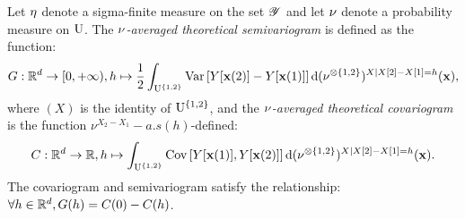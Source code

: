 Let $\eta$ denote a sigma-finite measure on the set $\mathscr{Y}$  and let $\nu$ denote a probability measure on  $\mathrm{U}$.
The {\em $\nu$-averaged theoretical semivariogram} is defined as the function: 
\begin{equation}G:\mathbb{R}^d\to[0,+\infty),h\mapsto\frac12\int_{\mathrm{U}^{\{1,2\}}} \mathrm{Var}\left[Y[\mathbf{x}(2)]-Y[\mathbf{x}(1)]\right] \mathrm{d}(\nu^{\otimes \{1,2\}})^{X\mid X[2]-X[1]=h}(\mathbf{x}),\label{eq:averagesemivariogram}\end{equation} 
where $(X)$ is the identity of $\mathrm{U}^{\{1,2\}}$, and the {\em $\nu$-averaged theoretical covariogram} is the function  $\nu^{X_2-X_1}-a.s(h)$-defined:
\begin{equation}C:\mathbb{R}^d\to\mathbb{R}, h\mapsto\int_{\mathrm{U}^{\{1,2\}}} \mathrm{Cov}\left[Y[\mathbf{x}(1)],Y[\mathbf{x}(2)]\right] \mathrm{d}(\nu^{\otimes \{1,2\}})^{X\mid X[2]-X[1]=h}(\mathbf{x}).\label{eq:averagecovariogram}\end{equation} The covariogram and semivariogram satisfy the relationship: $\forall h\in\mathbb{R}^d, G(h)=C(0)-C(h)$.

